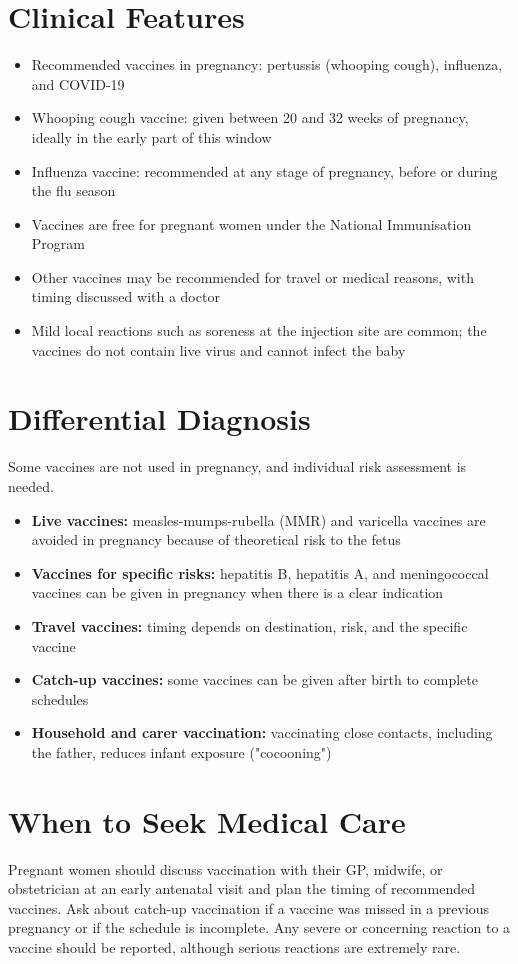 \section*{Clinical Features}
\begin{itemize}
    \item Recommended vaccines in pregnancy: pertussis (whooping cough), influenza, and COVID-19
    \item Whooping cough vaccine: given between 20 and 32 weeks of pregnancy, ideally in the early part of this window
    \item Influenza vaccine: recommended at any stage of pregnancy, before or during the flu season
    \item Vaccines are free for pregnant women under the National Immunisation Program
    \item Other vaccines may be recommended for travel or medical reasons, with timing discussed with a doctor
    \item Mild local reactions such as soreness at the injection site are common; the vaccines do not contain live virus and cannot infect the baby
\end{itemize}

\section*{Differential Diagnosis}
Some vaccines are not used in pregnancy, and individual risk assessment is needed.
\begin{itemize}
    \item \textbf{Live vaccines:} measles-mumps-rubella (MMR) and varicella vaccines are avoided in pregnancy because of theoretical risk to the fetus
    \item \textbf{Vaccines for specific risks:} hepatitis B, hepatitis A, and meningococcal vaccines can be given in pregnancy when there is a clear indication
    \item \textbf{Travel vaccines:} timing depends on destination, risk, and the specific vaccine
    \item \textbf{Catch-up vaccines:} some vaccines can be given after birth to complete schedules
    \item \textbf{Household and carer vaccination:} vaccinating close contacts, including the father, reduces infant exposure ("cocooning")
\end{itemize}

\section*{When to Seek Medical Care}
Pregnant women should discuss vaccination with their GP, midwife, or obstetrician at an early antenatal visit and plan the timing of recommended vaccines. Ask about catch-up vaccination if a vaccine was missed in a previous pregnancy or if the schedule is incomplete. Any severe or concerning reaction to a vaccine should be reported, although serious reactions are extremely rare.

